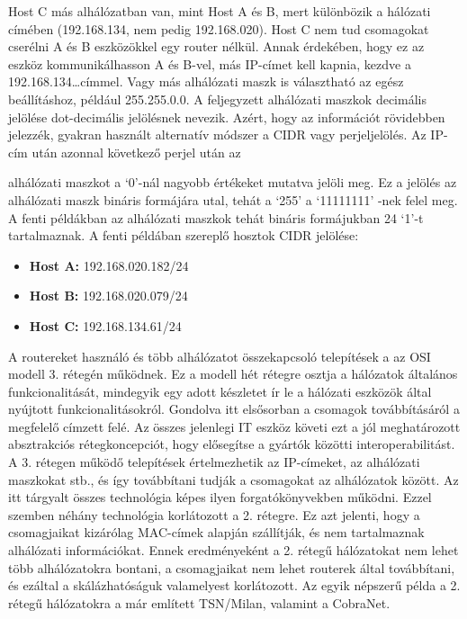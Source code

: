 Host C más alhálózatban van, mint Host A és B, mert különbözik a hálózati címében (192.168.134, nem pedig 192.168.020).
Host C nem tud csomagokat cserélni A és B eszközökkel egy router nélkül. 
Annak érdekében, hogy ez az eszköz kommunikálhasson A és B-vel, más IP-címet kell kapnia,
kezdve a 192.168.134\ldots címmel. 
Vagy más alhálózati maszk is választható az egész beállításhoz,
például 255.255.0.0.
A feljegyzett alhálózati maszkok decimális jelölése dot-decimális jelölésnek nevezik.
Azért, hogy az információt rövidebben jelezzék, gyakran
használt alternatív módszer a CIDR vagy perjeljelölés.
Az IP-cím után azonnal következő perjel után az




alhálózati maszkot a `0'-nál nagyobb értékeket mutatva jelöli meg.
Ez a jelölés az alhálózati maszk bináris formájára utal, tehát a `255' a `11111111' -nek felel meg.
A fenti példákban az alhálózati maszkok tehát bináris formájukban 24
`1'-t tartalmaznak. 
A fenti példában szereplő hosztok CIDR jelölése:
\begin{itemize}
    \item \textbf{Host A:} 192.168.020.182/24
    \item \textbf{Host B:} 192.168.020.079/24
    \item \textbf{Host C:} 192.168.134.61/24
\end{itemize}

A routereket használó és több alhálózatot összekapcsoló telepítések a
az OSI modell 3. rétegén működnek. Ez a modell hét rétegre osztja a
hálózatok általános funkcionalitását, mindegyik egy adott készletet ír le a hálózati
eszközök által nyújtott funkcionalitásokról. Gondolva itt elsősorban a csomagok továbbításáról a
megfelelő címzett felé. Az összes jelenlegi IT eszköz követi ezt a jól
meghatározott absztrakciós rétegkoncepciót, hogy elősegítse a gyártók közötti
interoperabilitást. A 3. rétegen működő telepítések értelmezhetik az IP-címeket,
az alhálózati maszkokat stb., és így továbbítani tudják a csomagokat az
alhálózatok között. Az itt tárgyalt összes technológia képes ilyen
forgatókönyvekben működni. Ezzel szemben néhány technológia korlátozott a 2.
rétegre. Ez azt jelenti, hogy a csomagjaikat kizárólag MAC-címek alapján
szállítják, és nem tartalmaznak alhálózati információkat. Ennek eredményeként a
2. rétegű hálózatokat nem lehet több alhálózatokra bontani, a csomagjaikat nem
lehet routerek által továbbítani, és ezáltal a skálázhatóságuk valamelyest
korlátozott. Az egyik népszerű példa a 2. rétegű hálózatokra a már említett
TSN/Milan, valamint a CobraNet.

